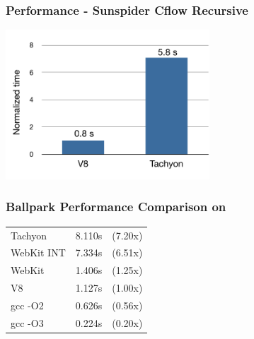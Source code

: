 % 

\begin{frame}
\frametitle{\bf Performance - Sunspider Cflow Recursive}

\begin{center}
\includegraphics[width=3in]{images/perf-sunspider}
\end{center}


\end{frame}

\begin{frame}
\frametitle{\bf Ballpark Performance Comparison on }

\begin{center}
\begin{tabular}{lll}
Tachyon     & 8.110s & (7.20x) \\
WebKit INT  & 7.334s & (6.51x) \\
WebKit      & 1.406s & (1.25x) \\
V8          & 1.127s & (1.00x) \\
gcc -O2     & 0.626s & (0.56x) \\
gcc -O3     & 0.224s & (0.20x)
\end{tabular}
\end{center}

\end{frame}

